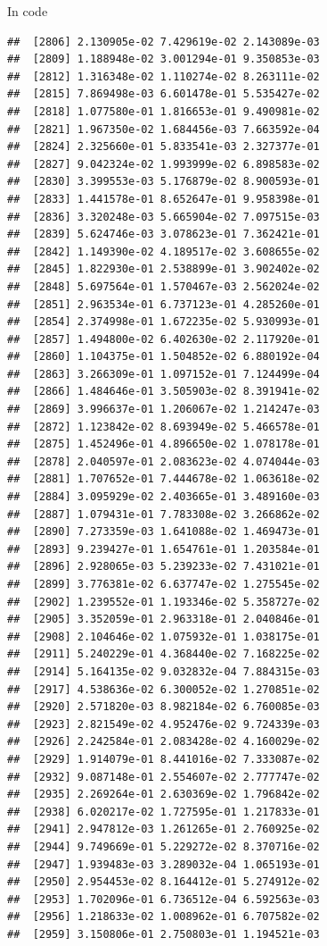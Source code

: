\documentclass[ignorenonframetext,]{beamer}
\begin{document}
\begin{frame}[fragile]{In code}
\begin{verbatim}
##  [2806] 2.130905e-02 7.429619e-02 2.143089e-03
##  [2809] 1.188948e-02 3.001294e-01 9.350853e-03
##  [2812] 1.316348e-02 1.110274e-02 8.263111e-02
##  [2815] 7.869498e-03 6.601478e-01 5.535427e-02
##  [2818] 1.077580e-01 1.816653e-01 9.490981e-02
##  [2821] 1.967350e-02 1.684456e-03 7.663592e-04
##  [2824] 2.325660e-01 5.833541e-03 2.327377e-01
##  [2827] 9.042324e-02 1.993999e-02 6.898583e-02
##  [2830] 3.399553e-03 5.176879e-02 8.900593e-01
##  [2833] 1.441578e-01 8.652647e-01 9.958398e-01
##  [2836] 3.320248e-03 5.665904e-02 7.097515e-03
##  [2839] 5.624746e-03 3.078623e-01 7.362421e-01
##  [2842] 1.149390e-02 4.189517e-02 3.608655e-02
##  [2845] 1.822930e-01 2.538899e-01 3.902402e-02
##  [2848] 5.697564e-01 1.570467e-03 2.562024e-02
##  [2851] 2.963534e-01 6.737123e-01 4.285260e-01
##  [2854] 2.374998e-01 1.672235e-02 5.930993e-01
##  [2857] 1.494800e-02 6.402630e-02 2.117920e-01
##  [2860] 1.104375e-01 1.504852e-02 6.880192e-04
##  [2863] 3.266309e-01 1.097152e-01 7.124499e-04
##  [2866] 1.484646e-01 3.505903e-02 8.391941e-02
##  [2869] 3.996637e-01 1.206067e-02 1.214247e-03
##  [2872] 1.123842e-02 8.693949e-02 5.466578e-01
##  [2875] 1.452496e-01 4.896650e-02 1.078178e-01
##  [2878] 2.040597e-01 2.083623e-02 4.074044e-03
##  [2881] 1.707652e-01 7.444678e-02 1.063618e-02
##  [2884] 3.095929e-02 2.403665e-01 3.489160e-03
##  [2887] 1.079431e-01 7.783308e-02 3.266862e-02
##  [2890] 7.273359e-03 1.641088e-02 1.469473e-01
##  [2893] 9.239427e-01 1.654761e-01 1.203584e-01
##  [2896] 2.928065e-03 5.239233e-02 7.431021e-01
##  [2899] 3.776381e-02 6.637747e-02 1.275545e-02
##  [2902] 1.239552e-01 1.193346e-02 5.358727e-02
##  [2905] 3.352059e-01 2.963318e-01 2.040846e-01
##  [2908] 2.104646e-02 1.075932e-01 1.038175e-01
##  [2911] 5.240229e-01 4.368440e-02 7.168225e-02
##  [2914] 5.164135e-02 9.032832e-04 7.884315e-03
##  [2917] 4.538636e-02 6.300052e-02 1.270851e-02
##  [2920] 2.571820e-03 8.982184e-02 6.760085e-03
##  [2923] 2.821549e-02 4.952476e-02 9.724339e-03
##  [2926] 2.242584e-01 2.083428e-02 4.160029e-02
##  [2929] 1.914079e-01 8.441016e-02 7.333087e-02
##  [2932] 9.087148e-01 2.554607e-02 2.777747e-02
##  [2935] 2.269264e-01 2.630369e-02 1.796842e-02
##  [2938] 6.020217e-02 1.727595e-01 1.217833e-01
##  [2941] 2.947812e-03 1.261265e-01 2.760925e-02
##  [2944] 9.749669e-01 5.229272e-02 8.370716e-02
##  [2947] 1.939483e-03 3.289032e-04 1.065193e-01
##  [2950] 2.954453e-02 8.164412e-01 5.274912e-02
##  [2953] 1.702096e-01 6.736512e-04 6.592563e-03
##  [2956] 1.218633e-02 1.008962e-01 6.707582e-02
##  [2959] 3.150806e-01 2.750803e-01 1.194521e-03

\end{verbatim}
\end{frame}
\end{document}
